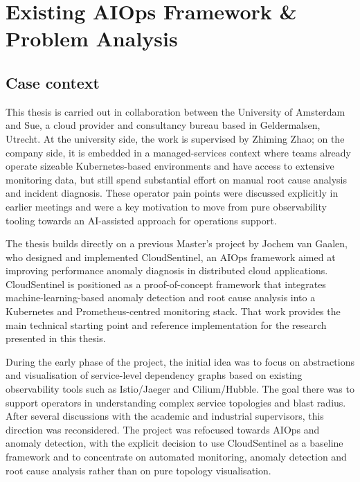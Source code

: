 \chapter{Existing AIOps Framework \& Problem Analysis}%
\label{ch:existing_framework}


\section{Case context}
This thesis is carried out in collaboration between the University of Amsterdam and Sue, a cloud provider and consultancy bureau based in Geldermalsen, Utrecht. At the university side, the work is supervised by Zhiming Zhao; on the company side, it is embedded in a managed-services context where teams already operate sizeable Kubernetes-based environments and have access to extensive monitoring data, but still spend substantial effort on manual root cause analysis and incident diagnosis. These operator pain points were discussed explicitly in earlier meetings and were a key motivation to move from pure observability tooling towards an AI-assisted approach for operations support.

The thesis builds directly on a previous Master’s project by Jochem van Gaalen, who designed and implemented CloudSentinel, an AIOps framework aimed at improving performance anomaly diagnosis in distributed cloud applications. CloudSentinel is positioned as a proof-of-concept framework that integrates machine-learning-based anomaly detection and root cause analysis into a Kubernetes and Prometheus-centred monitoring stack. That work provides the main technical starting point and reference implementation for the research presented in this thesis.

During the early phase of the project, the initial idea was to focus on abstractions and visualisation of service-level dependency graphs based on existing observability tools such as Istio/Jaeger and Cilium/Hubble. The goal there was to support operators in understanding complex service topologies and blast radius. After several discussions with the academic and industrial supervisors, this direction was reconsidered. The project was refocused towards AIOps and anomaly detection, with the explicit decision to use CloudSentinel as a baseline framework and to concentrate on automated monitoring, anomaly detection and root cause analysis rather than on pure topology visualisation.

